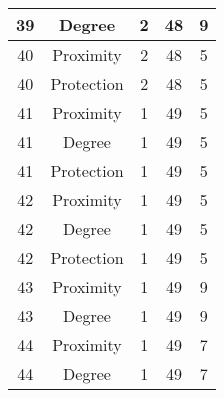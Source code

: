 \documentclass[results.tex]{subfiles}
\begin{document}
\begin{center}
\begin{tabular}{| c || c | c | c | c |}
            \hline
            39                      & Degree                       & 2                      & 48                      & 9                    \\
            \hline
            40                      & Proximity                    & 2                      & 48                      & 5                    \\
            \hline
            40                      & Protection                   & 2                      & 48                      & 5                    \\
            \hline
            41                      & Proximity                    & 1                      & 49                      & 5                    \\
            \hline
            41                      & Degree                       & 1                      & 49                      & 5                    \\
            \hline
            41                      & Protection                   & 1                      & 49                      & 5                    \\
            \hline
            42                      & Proximity                    & 1                      & 49                      & 5                    \\
            \hline
            42                      & Degree                       & 1                      & 49                      & 5                    \\
            \hline
            42                      & Protection                   & 1                      & 49                      & 5                    \\
            \hline
            43                      & Proximity                    & 1                      & 49                      & 9                    \\
            \hline
            43                      & Degree                       & 1                      & 49                      & 9                    \\
            \hline
            44                      & Proximity                    & 1                      & 49                      & 7                    \\
            \hline
            44                      & Degree                       & 1                      & 49                      & 7                    \\

\end{tabular}
\end{center}
\end{document}
